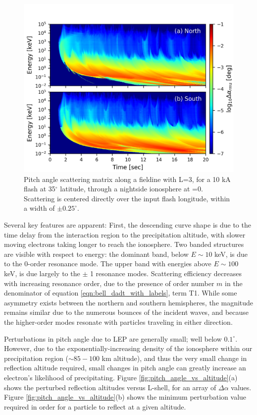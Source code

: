 \begin{figure}[h]
\begin{center}
\includegraphics{figures/dA_E-t_spectra.png}
\caption[Pitch angle scattering matrix for a flash at 35$^\circ$ latitude and L=3]{Pitch angle scattering matrix along a fieldine with L=3, for a 10 kA flash at 35$^\circ$ latitude, through a nightside ionosphere at \kp{}=0. Scattering is centered directly over the input flash longitude, within a width of $\pm0.25^\circ.$}
\label{fig:dA_spectra}
\end{center}
\end{figure}

Several key features are apparent: First, the descending curve shape is due to the time delay from the interaction region to the precipitation altitude, with slower moving electrons taking longer to reach the ionosphere. Two banded structures are visible with respect to energy: the dominant band, below $E \sim 10$ keV, is due to the 0-order resonance mode. The upper band with energies above $E  \sim 100$ keV, is due largely to the $\pm$ 1 resonance modes. Scattering efficiency decreases with increasing resonance order, due to the presence of order number $m$ in the denominator of equation \eqref{eqn:bell_dadt_with_labels}, term T1. While some asymmetry exists between the northern and southern hemispheres, the magnitude remains similar due to the numerous bounces of the incident waves, and because the higher-order modes resonate with particles traveling in either direction.

Perturbations in pitch angle due to LEP are generally small; well below $0.1^\circ$. However, due to the exponentially-increasing density of the ionosphere within our precipitation region ($\sim 85 - 100 $ km altitude), and thus the very small change in reflection altitude required, small changes in pitch angle can greatly increase an electron's likelihood of precipitating. Figure \ref{fig:pitch_angle_vs_altitude}(a) shows the perturbed reflection altitudes versus L-shell, for an array of $\Delta \alpha$ values. Figure \ref{fig:pitch_angle_vs_altitude}(b) shows the minimum perturbation value required in order for a particle to reflect at a given altitude.

